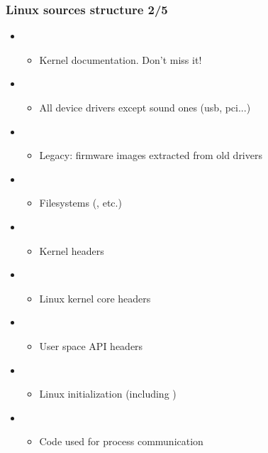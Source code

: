 \begin{frame}
  \frametitle{Linux sources structure 2/5}
  \begin{itemize}
  \item {}
    \begin{itemize}
    \item Kernel documentation. Don't miss it!
    \end{itemize}
  \item {}
    \begin{itemize}
    \item All device drivers except sound ones (usb, pci...)
    \end{itemize}
  \item {}
    \begin{itemize}
    \item Legacy: firmware images extracted from old drivers
    \end{itemize}
  \item {}
    \begin{itemize}
    \item Filesystems (, etc.)
    \end{itemize}
  \item {}
    \begin{itemize}
    \item Kernel headers
    \end{itemize}
  \item {}
    \begin{itemize}
    \item Linux kernel core headers
    \end{itemize}
  \item {}
    \begin{itemize}
    \item User space API headers
    \end{itemize}
  \item {}
    \begin{itemize}
    \item Linux initialization (including )
    \end{itemize}
  \item {}
    \begin{itemize}
    \item Code used for process communication
    \end{itemize}
  \end{itemize}
\end{frame}

